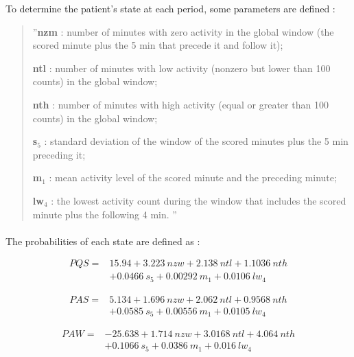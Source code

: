 \documentclass[a4paper,12pt]{article}
\begin{document}
To determine the patient's state at each period, some parameters are defined :
\begin{quotation}
\em 
\item ''\textbf{nzm} : number of minutes with zero activity in the global window (the scored minute plus the 5 min that precede it and follow it);
\item \textbf{ntl} : number of minutes with low activity (nonzero but lower than 100 counts) in the global window;
\item \textbf{nth} : number of minutes with high activity (equal or greater than 100 counts) in the global window;
\item \textbf{s}$_5$ : standard deviation of the window of the scored minutes plus the 5 min preceding it;
\item \textbf{m}$_1$ : mean activity level of the scored minute and the preceding minute;
\item \textbf{lw}$_4$ : the lowest activity count during the window that includes the scored minute plus the following 4 min. ''~\cite{Sadeh1995} 
\end{quotation}

\paragraph{}
The probabilities of each state are defined as :

\begin{equation}
\begin{split}
PQS =& 15.94 + 3.223\: nzw + 2.138\: ntl + 1.1036\: nth \\
      &+ 0.0466\: s_5 + 0.00292\: m_1 + 0.0106\: lw_4
\end{split}
\end{equation}

\begin{equation}
\begin{split}
PAS =& 5.134 + 1.696\: nzw + 2.062\: ntl + 0.9568\: nth \\
      &+ 0.0585\: s_5 + 0.00556\: m_1 + 0.0105\: lw_4
\end{split}
\end{equation}

\begin{equation}
\begin{split}
PAW =& -25.638 + 1.714\: nzw + 3.0168\: ntl + 4.064\: nth \\
      &+ 0.1066\: s_5 + 0.0386\: m_1 + 0.016\: lw_4
\end{split}
\end{equation}
\end{document}
